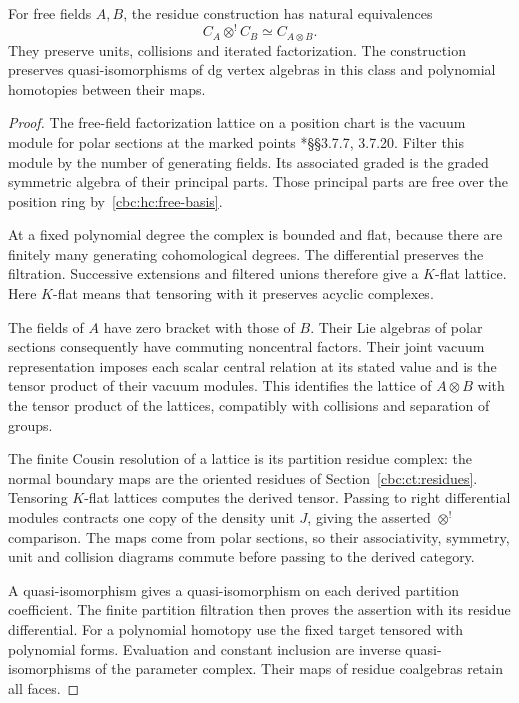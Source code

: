 \begin{lemma}\label{cbc:va:free-field-tensor}
For free fields $A,B$, the residue construction has
natural equivalences
\[
 C_A\otimes^!C_B\simeq C_{A\otimes B}.
\]
They preserve units, collisions and iterated
factorization. The construction preserves
quasi-isomorphisms of dg vertex algebras in this
class and polynomial homotopies between their maps.
\end{lemma}
\begin{proof}
The free-field factorization lattice on a position
chart is the vacuum module for polar sections at the
marked points
\cite{BD04}*{\S\S3.7.7, 3.7.20}.
Filter this module by the number of generating fields.
Its associated graded is the graded symmetric algebra
of their principal parts. Those principal parts are
free over the position ring by~\eqref{cbc:hc:free-basis}.

At a fixed polynomial degree the complex is bounded
and flat, because there are finitely many generating
cohomological degrees. The differential preserves the
filtration. Successive extensions and filtered unions
therefore give a $K$-flat lattice. Here $K$-flat means
that tensoring with it preserves acyclic complexes.

The fields of $A$ have zero bracket with those of $B$.
Their Lie algebras of polar sections consequently
have commuting noncentral factors. Their joint vacuum
representation imposes each scalar central relation at
its stated value and is the tensor product of their
vacuum modules. This identifies the lattice of
$A\otimes B$ with the tensor product of the lattices,
compatibly with collisions and separation of groups.

The finite Cousin resolution of a lattice is its
partition residue complex: the normal boundary maps
are the oriented residues of
Section~\ref{cbc:ct:residues}. Tensoring $K$-flat lattices
computes the derived tensor. Passing to right
differential modules contracts one copy of the density
unit $J$, giving the asserted $\otimes^!$ comparison.
The maps come from polar sections, so their
associativity, symmetry, unit and collision diagrams
commute before passing to the derived category.

A quasi-isomorphism gives a quasi-isomorphism on each
derived partition coefficient. The finite partition
filtration then proves the assertion with its residue
differential. For a polynomial homotopy use the fixed
target tensored with polynomial forms. Evaluation and
constant inclusion are inverse quasi-isomorphisms of
the parameter complex. Their maps of residue
coalgebras retain all faces.
\end{proof}

